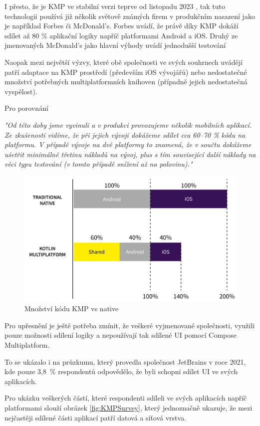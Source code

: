 I přesto, že je KMP ve stabilní verzi teprve od listopadu 2023 \cite{KMPstable}, tak tuto technologii používá již několik světově 
známých firem v produkčním nasazení jako je například Forbes či McDonald's. Forbes uvádí, že právě díky KMP dokáží sdílet až 80 \%
aplikační logiky napříč platformami Android a iOS. \cite{KMPinForbes} 
Druhý ze jmenovaných McDonald's jako hlavní výhody uvádí jednodušší testování \cite{KMPinMcDonalds}

Naopak mezi největší výzvy, které obě společnosti ve svých souhrnech uvádějí patří adaptace na KMP prostředí (především iOS vývojářů) nebo
nedostatečné množství potřebných multiplatformních knihoven (případně jejich nedostatečná vyspělost). \cite{KMPinForbes} \cite{KMPinMcDonalds}

Pro porovnání 

\emph{"Od této doby jsme vyvinuli a v produkci provozujeme několik mobilních aplikací. Ze zkušenosti vidíme, že při jejich vývoji dokážeme sdílet cca 60–70 \% kódu na platformu. V případě vývoje na dvě platformy to znamená, že v součtu dokážeme ušetřit minimálně třetinu nákladů na vývoj, plus s tím související další náklady na věci typu testování (v tomto případě snížení až na polovinu)."}

\begin{figure}[H]
  \centering
  \includegraphics[width=.7\textwidth]{chart-KMP-vs-native.png}
  \caption{Množství kódu KMP vs native}
  \label{fig:KMP_vs_native}
\end{figure}

Pro upřesnění je ještě potřeba zmínit, že veškeré vyjmenované společnosti, využili pouze možnosti sdílení logiky a nepoužívají
tak sdílené UI pomocí Compose Multiplatform.

To se ukázalo i na průzkumu, který provedla společnost JetBrains v roce 2021, kde pouze 3,8~\% respondentů odpovědělo, že byli schopni sdílet UI ve svých aplikacích.

Pro ukázku veškerých částí, které respondenti sdíleli ve svých aplikacích napříč platformami slouží obrázek \ref{fig:KMPSurvey}, který jednoznačně ukazuje, že
mezi nejčastěji sdílené části aplikací patří datová a síťová vrstva.  

